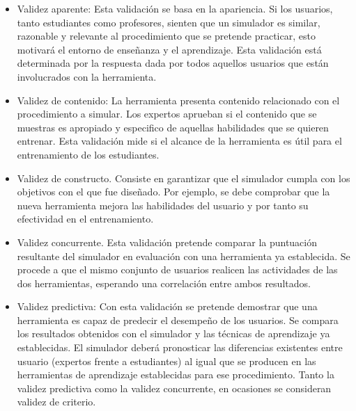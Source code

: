 \begin{itemize}
    \item Validez aparente:
    Esta validación se basa en la apariencia. Si los usuarios, tanto estudiantes como profesores, sienten que un simulador es similar, razonable y relevante al procedimiento que se pretende practicar, esto motivará el entorno de enseñanza y el aprendizaje. Esta validación está determinada por la respuesta dada por todos aquellos usuarios que están involucrados con la herramienta.
    
    \item Validez de contenido: La herramienta presenta contenido relacionado con el procedimiento a simular. Los expertos aprueban si el contenido que se muestras es apropiado y especifico de aquellas habilidades que se quieren entrenar.
    Esta validación mide si el alcance de la herramienta es útil para el entrenamiento de los estudiantes.
    
        \item Validez de constructo.
    Consiste en garantizar que el simulador cumpla con los objetivos con el que fue diseñado. Por ejemplo, se debe comprobar que la nueva herramienta mejora las habilidades del usuario y por tanto su efectividad en el entrenamiento. 
    
    \item Validez concurrente.
    Esta validación pretende comparar la puntuación resultante del simulador en evaluación con una herramienta ya establecida. Se procede a que el mismo conjunto de usuarios realicen las actividades de las dos herramientas, esperando una correlación entre ambos resultados.

    \item Validez predictiva:
    Con esta validación se pretende demostrar que una herramienta es capaz de predecir el desempeño de los usuarios. Se compara los resultados obtenidos con el simulador y las técnicas de aprendizaje ya establecidas. El simulador deberá pronosticar las diferencias existentes entre usuario (expertos frente a estudiantes) al igual que se producen en las herramientas de aprendizaje establecidas para ese procedimiento.  Tanto la validez predictiva como la validez concurrente, en ocasiones se consideran validez de criterio. 
    
    

    


    





\end{itemize}
